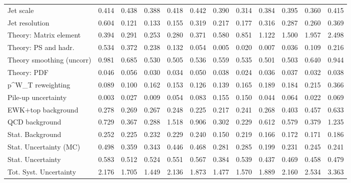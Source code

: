 \begin{tabular}{l|p{0.6cm}p{0.6cm}p{0.6cm}p{0.6cm}p{0.6cm}p{0.6cm}p{0.6cm}p{0.6cm}p{0.6cm}p{0.6cm}p{0.6cm}}
Jet scale                                & 0.414 & 0.438 & 0.388 & 0.418 & 0.442 & 0.390 & 0.314 & 0.384 & 0.395 & 0.360 & 0.415 \\
Jet resolution                           & 0.604 & 0.121 & 0.133 & 0.155 & 0.319 & 0.217 & 0.177 & 0.316 & 0.287 & 0.260 & 0.369 \\
Theory: Matrix element                   & 0.394 & 0.291 & 0.253 & 0.280 & 0.371 & 0.580 & 0.851 & 1.122 & 1.500 & 1.957 & 2.498 \\
Theory: PS and hadr.                     & 0.534 & 0.372 & 0.238 & 0.132 & 0.054 & 0.005 & 0.020 & 0.007 & 0.036 & 0.109 & 0.216 \\
Theory smoothing (uncorr)                & 0.981 & 0.685 & 0.530 & 0.505 & 0.536 & 0.559 & 0.535 & 0.501 & 0.503 & 0.640 & 0.944 \\
Theory: PDF                              & 0.046 & 0.056 & 0.030 & 0.034 & 0.050 & 0.038 & 0.024 & 0.036 & 0.037 & 0.032 & 0.038 \\
p^{W}_{T} reweighting                    & 0.089 & 0.100 & 0.162 & 0.153 & 0.126 & 0.139 & 0.165 & 0.189 & 0.184 & 0.215 & 0.366 \\
Pile-up uncertainty                      & 0.003 & 0.027 & 0.009 & 0.054 & 0.083 & 0.155 & 0.150 & 0.044 & 0.064 & 0.022 & 0.069 \\
EWK+top background                       & 0.278 & 0.269 & 0.267 & 0.248 & 0.225 & 0.217 & 0.241 & 0.268 & 0.403 & 0.457 & 0.633 \\
QCD background                           & 0.729 & 0.367 & 0.288 & 1.518 & 0.906 & 0.302 & 0.229 & 0.612 & 0.579 & 0.379 & 1.235 \\
Stat. Background                         & 0.252 & 0.225 & 0.232 & 0.229 & 0.240 & 0.150 & 0.219 & 0.166 & 0.172 & 0.171 & 0.186 \\
Stat. Uncertainty (MC)                   & 0.498 & 0.359 & 0.343 & 0.446 & 0.468 & 0.281 & 0.285 & 0.199 & 0.231 & 0.245 & 0.241 \\
\hline
Stat. Uncertainty                        & 0.583 & 0.512 & 0.524 & 0.551 & 0.567 & 0.384 & 0.539 & 0.437 & 0.469 & 0.458 & 0.479 \\
\hline
Tot. Syst. Uncertainty                   & 2.176 & 1.705 & 1.449 & 2.136 & 1.873 & 1.477 & 1.570 & 1.889 & 2.160 & 2.534 & 3.363 \\
\hline
\end{tabular}
